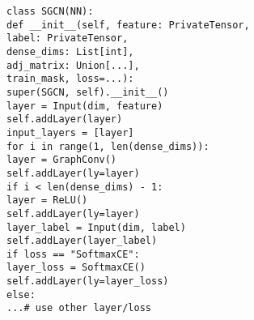 \begin{frame}{\texttt{class SGCN(NN):}}
\\\texttt{def \_\_init\_\_(self, feature: PrivateTensor, 
\\\indent\indent\indent\indent\indent\indent label: PrivateTensor, 
\\\indent\indent\indent\indent\indent\indent dense\_dims: List[int],
\\\indent\indent\indent\indent\indent\indent adj\_matrix: Union[...],
\\\indent\indent\indent\indent\indent\indent train\_mask, loss=...):}
\\\indent\texttt{super(SGCN, self).\_\_init\_\_()}
\\\indent\texttt{layer = Input(dim, feature)}
\\\indent\texttt{self.addLayer(layer)}
\\\indent\texttt{input\_layers = [layer]}
\\\indent\texttt{for i in range(1, len(dense\_dims)):}
\\\indent\indent\texttt{layer = GraphConv()}
\\\indent\indent\texttt{self.addLayer(ly=layer)}
\\\indent\indent\texttt{if i < len(dense\_dims) - 1:}
\\\indent\indent\indent\texttt{layer = ReLU()} 
\\\indent\indent\indent\texttt{self.addLayer(ly=layer)}
\\\indent\texttt{layer\_label = Input(dim, label)}
\\\indent\texttt{self.addLayer(layer\_label)}
\\\indent\texttt{if loss == "SoftmaxCE":} 
\\\indent\indent\texttt{layer\_loss = SoftmaxCE()}
\\\indent\indent\texttt{self.addLayer(ly=layer\_loss)}
\\\indent\texttt{else:}
\\\indent\indent\texttt{...\# use other layer/loss}
\end{frame}

